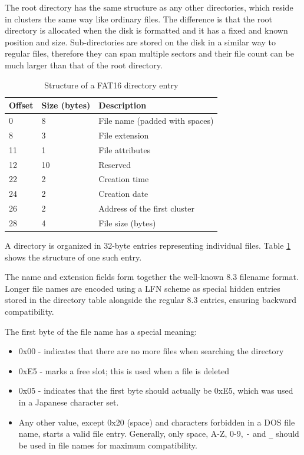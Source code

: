 The root directory has the same structure as any other directories, which reside in clusters the same way like ordinary files. The difference is that the root directory is allocated when the disk is formatted and it has a fixed and known position and size. Sub-directories are stored on the disk in a similar way to regular files, therefore they can span multiple sectors and their file count can be much larger than that of the root directory.

\begin{table}
	\centering
	\begin{tabular}{lll}
		\toprule
		\textbf{Offset} & \textbf{Size (bytes)}  & \textbf{Description}\\
		\midrule
		0 & 8 & File name (padded with spaces) \\
		8 & 3 & File extension \\
		11 & 1 & File attributes \\
		12 & 10 & Reserved \\
		22 & 2 & Creation time \\
		24 & 2 & Creation date \\
		26 & 2 & Address of the first cluster \\
		28 & 4 & File size (bytes) \\
		\bottomrule
	\end{tabular}
	\caption{\label{tab:fat16-dir-entry}Structure of a FAT16 directory entry}
\end{table}

A directory is organized in 32-byte entries representing individual files. Table \ref{tab:fat16-dir-entry} shows the structure of one such entry.

The name and extension fields form together the well-known 8.3 filename format. Longer file names are encoded using a \gls{LFN} scheme as special hidden entries stored in the directory table alongside the regular 8.3 entries, ensuring backward compatibility.

The first byte of the file name has a special meaning:

\begin{itemize}
	\item 0x00 - indicates that there are no more files when searching the directory
	\item 0xE5 - marks a free slot; this is used when a file is deleted
	\item 0x05 - indicates that the first byte should actually be 0xE5, which was used in a Japanese character set.
	\item Any other value, except 0x20 (space) and characters forbidden in a DOS file name, starts a valid file entry. Generally, only space, A-Z, 0-9, \verb|-| and \verb|_| should be used in file names for maximum compatibility.
\end{itemize}

